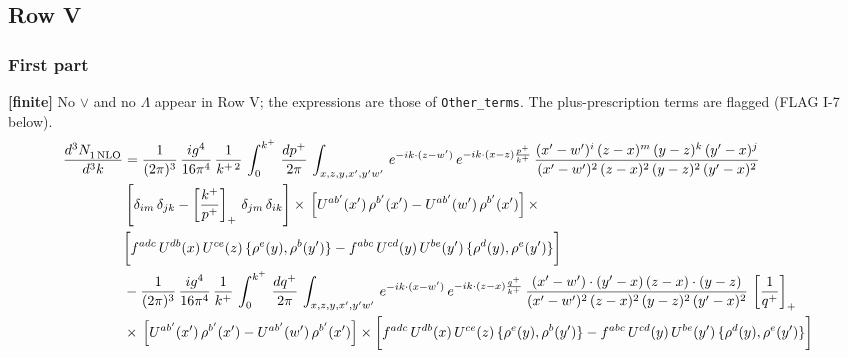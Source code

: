 \documentclass[9pt]{article}
\numberwithin{equation}{section}
\begin{document}
\subsection{Row V}
\subsubsection*{First part}
\textbf{[finite]} No $\vee$ and no $\Lambda$ appear in Row V; the expressions are those of \texttt{Other\_terms}. The plus-prescription terms are flagged (FLAG I-7 below).
\begin{align}
     \frac{d^{3}N_{1\,\rm NLO}^{\rm}}{d^{3}k}  & =  \frac{1}{(2\pi)^{3}}\, \frac{ig^{4}}{16\pi^{4}}\, \frac{1}{k^{+\,2}}\,\int_{0}^{k^{+}}\, \frac{dp^{+}}{2\pi}\,\int_{x,z,y,x',y'w'}\,e^{-ik\cdot (z-w^\prime)}\,e^{-ik\cdot (x-z)\frac{p^{+}}{k^{+}}}\,\frac{(x'-w')^{i}\,(z-x)^{m}\,(y-z)^{k}\,(y'-x)^{j}}{(x'-w')^{2}\,(z-x)^{2}\,(y-z)^{2}\,(y'-x)^{2}}\,\notag \\ & \left[\delta_{im}\,\delta_{jk}-\left[\frac{k^{+}}{p^{+}}\right]_{+}\, \delta_{jm}\,\delta_{ik}\right]\times\, \left[U^{ab'}(x')\,\rho^{b'}(x')-U^{ab'}(w')\,\rho^{b'}(x')\right]\times\notag \\ & \bigg[f^{adc}\,U^{db}(x)\,U^{ce}(z)\, \{\rho^{e}(y),\rho^{b}(y')\}-f^{abc}\,U^{cd}(y)\,U^{be}(y')\, \{\rho^{d}(y),\rho^{e}(y')\}\bigg] \notag \\ & -\frac{1}{(2\pi)^{3}}\, \frac{ig^{4}}{16\pi^{4}}\, \frac{1}{k^{+}}\,\int_{0}^{k^{+}}\, \frac{dq^{+}}{2\pi}\,\int_{x,z,y,x',y'w'}\,e^{-ik\cdot (x-w^\prime)}\,e^{-ik\cdot (z-x)\frac{q^{+}}{k^{+}}}\,\frac{(x'-w')\cdot (y'-x)\,(z-x)\cdot (y-z)}{(x'-w')^{2}\,(z-x)^{2}\,(y-z)^{2}\,(y'-x)^{2}}\,\left[\frac{1}{q^{+}}\right]_{+}\notag \\ & \times\, \left[U^{ab'}(x')\,\rho^{b'}(x')-U^{ab'}(w')\,\rho^{b'}(x')\right]\times \bigg[f^{adc}\,U^{db}(x)\,U^{ce}(z)\, \{\rho^{e}(y),\rho^{b}(y')\}-f^{abc}\,U^{cd}(y)\,U^{be}(y')\, \{\rho^{d}(y),\rho^{e}(y')\}\bigg]
\end{align}
\end{document}
